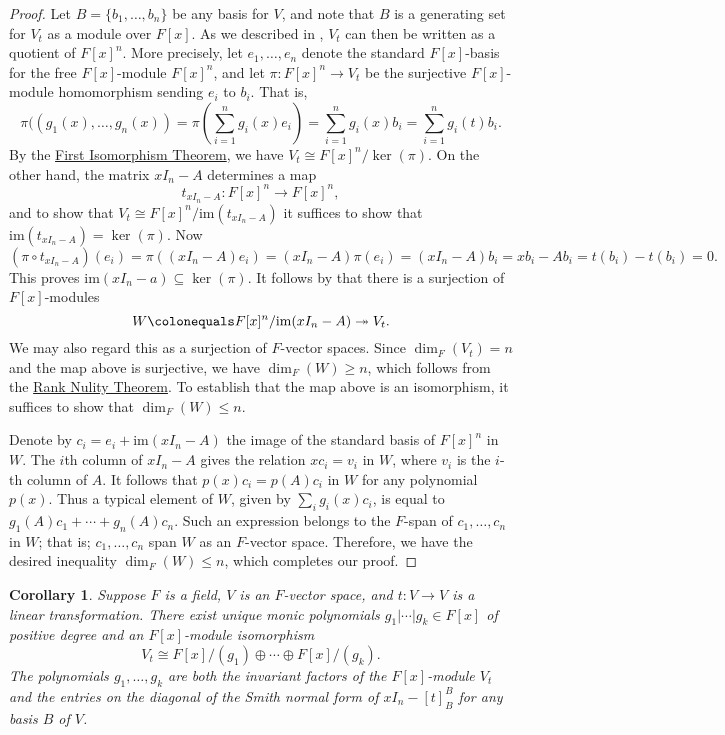 \documentclass[12pt]{report}
\newtheorem{corollary}[theorem]{Corollary}
\numberwithin{equation}{section}
\numberwithin{theorem}{chapter}
\theoremstyle{definition}
\newtheorem*{basic properties}{Basic Properties}
\newtheorem*{Important Remark}{Important Remark}
\renewcommand{\ker}{\operatorname{ker}}
\begin{document}
\begin{proof} 
Let $B=\{b_1, \dots, b_n\}$ be any basis for $V$, and note that $B$ is a generating set for $V_t$ as a module over $F[x]$. As we described in , $V_t$ can then be written as a quotient of $F[x]^n$. More precisely, let $e_1, \dots, e_n$ denote the standard $F[x]$-basis for the free $F[x]$-module $F[x]^n$, and let $\pi\!: F[x]^n \to V_t$ be the surjective $F[x]$-module homomorphism sending $e_i$ to $b_i$. That is,
$$
\pi((g_1(x), \dots, g_n(x)) = \pi \left( \sum_{i=1}^n g_i(x) e_i \right) = \sum_{i=1}^n g_i(x) b_i = \sum_{i=1}^n g_i(t) b_i.
$$
By the \hyperref[first iso thm]{First Isomorphism Theorem}, we have $V_t\cong F[x]^n/\ker(\pi)$. On the other hand, the matrix $xI_n - A$ determines a map
$$t_{xI_n - A}: F[x]^n \to F[x]^n,$$
and to show that $V_t\cong F[x]^n/\mathrm{im}(t_{xI_n - A})$ it suffices to show  that $\mathrm{im}(t_{xI_n - A}) = \ker(\pi)$.
Now
$$(\pi \circ t_{xI_n - A})(e_i)=\pi((xI_n - A)e_i)=(xI_n - A)\pi(e_i)=(xI_n - A)b_i=xb_i-Ab_i=t(b_i)-t(b_i)=0.$$ 
This proves $\mathrm{im}(xI_n - a) \subseteq \ker(\pi)$. It follows by  that there is a surjection of $F[x]$-modules
$$W \colonequals F[x]^n/\mathrm{im}(xI_n - A) \twoheadrightarrow V_t.$$
We may also regard this as a surjection of $F$-vector spaces. Since $\dim_F(V_t) = n$ and the map above is surjective, we have $\dim_F(W)\geqslant n$, which follows from the \hyperref[rank nulity]{Rank Nulity Theorem}. To establish that the map above is an isomorphism, it suffices to show that $\dim_F(W) \leqslant n$. 

Denote by $c_i=e_i+\mathrm{im}(xI_n - A)$ the image of the standard basis of $F[x]^n$ in $W$.
The $i$th column of $xI_n - A$ gives the relation $x c_i = v_i$ in
$W$, where $v_i$ is the $i$-th column of $A$. It follows that $p(x) c_i = p(A) c_i$ in $W$ for any
polynomial $p(x)$. Thus a typical element of $W$, given by $\sum_i g_i(x) c_i$, is equal to $g_1(A) c_1 + \cdots + g_n(A) c_n$. Such an
expression belongs to the $F$-span of $c_1, \ldots, c_n$ in $W$; that is;
$c_1, \ldots, c_n$ span $W$ as an $F$-vector space. Therefore, we have the desired inequality  $\dim_F(W) \leqslant n$, which completes our proof.
\end{proof}



\begin{corollary}\label{cor:IFendo}
Suppose $F$ is a field, $V$ is an $F$-vector space, and $t\!:V\to V$ is a linear transformation. There exist unique monic polynomials $g_1 | \cdots | g_k \in F[x]$ of positive degree and an $F[x]$-module isomorphism 
$$V_{t} \cong F[x]/(g_1)\oplus \cdots \oplus F[x]/(g_k).$$ 
The polynomials $g_1,\ldots, g_k$ are both the invariant factors of the $F[x]$-module $V_{t}$ and the entries on the diagonal of the Smith normal form of $xI_n-[t]_B^B$ for any basis $B$ of $V$.
\end{corollary}
\end{document}
